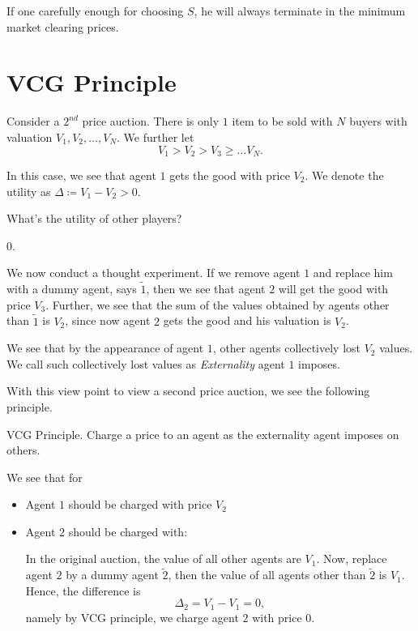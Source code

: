 If one carefully enough for choosing \(S\), he will always terminate in the minimum market clearing prices.

\section{VCG Principle}
Consider a \(2^{nd}\) price auction. There is only \(1\) item to be sold with \(N\) buyers with valuation \(V_{1}, V_{2}, \ldots , V_{N}\). We
further let
\[
	V_{1}>V_{2}>V_{3}\geq \ldots V_{N}.
\]

In this case, we see that agent \(1\) gets the good with price \(V_{2}\). We denote the utility as \(\Delta\coloneqq V_{1}-V_{2}>0\).

\begin{problem}
What's the utility of other players?
\begin{answer}
	\(0\).
\end{answer}
\end{problem}

\hr

We now conduct a thought experiment. If we remove agent \(1\) and replace him with a dummy agent, says \(\tilde{1}\), then we see that agent \(2\) will
get the good with price \(V_{3}\). Further, we see that the sum of the values obtained by agents other than \(\tilde{1}\) is \(V_{2}\), since now agent \(2\) gets
the good and his valuation is \(V_{2}\).

\hr

We see that by the appearance of agent \(1\), other agents collectively lost \(V_{2}\) values. We call such collectively lost values as \emph{Externality} agent \(1\) imposes.

With this view point to view a second price auction, we see the following principle.
\begin{theorem}
	VCG Principle. Charge a price to an agent as the externality agent imposes on others.
\end{theorem}
\begin{eg}
	We see that for
	\begin{itemize}
		\item Agent \(1\) should be charged with price \(V_2\)
		\item Agent \(2\) should be charged with:
		      \par In the original auction, the value of all other agents are \(V_{1}\). Now, replace agent \(2\) by a dummy agent \(\tilde{2}\), then the value of all agents other
		      than \(\tilde{2}\) is \(V_{1}\). Hence, the difference is
		      \[
			      \Delta_{2} = V_{1} - V_{1} = 0,
		      \]
		      namely by VCG principle, we charge agent \(2\) with price \(0\).
	\end{itemize}
\end{eg}

